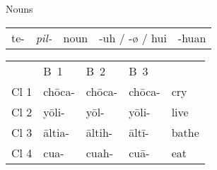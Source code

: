 \documentclass[12pt]{beamer}
\newcommand{\nah}[1]{\textcolor{nahgrn}{#1}}
\newcommand{\trs}[1]{\textcolor{nahblu}{#1}}
\begin{document}
\begin{frame}
\begin{columns}[t]
\begin{column}{.23\linewidth}
\begin{block}{Nouns}
\begin{enumerate}
\begin{tabular}[t]{lcccc}
				\nah{te-} 	& \textit{pil-} & noun & \trs{-uh} / \trs{-ø} / \trs{hui} & \trs{-huan}\\
			\end{tabular}%
			\begin{example}
				\begin{tabular}{lllll}
					& B~1          & B~2          & B~3          &             \\
					Cl 1 & \nah{chōca-} & \nah{chōca-} & \nah{chōca-} & \trs{cry}   \\
					Cl 2 & \nah{yōli-}  & \nah{yōl-}   & \nah{yōli-}  & \trs{live}  \\
					Cl 3 & \nah{āltia-} & \nah{āltih-} & \nah{āltī-}  & \trs{bathe} \\
					Cl 4 & \nah{cua-}   & \nah{cuah-}  & \nah{cuā-}   & \trs{eat}
				\end{tabular}
			\end{example}
        \end{enumerate}
      \end{block}
    \end{column}


\end{columns}
\end{frame}
\end{document}
